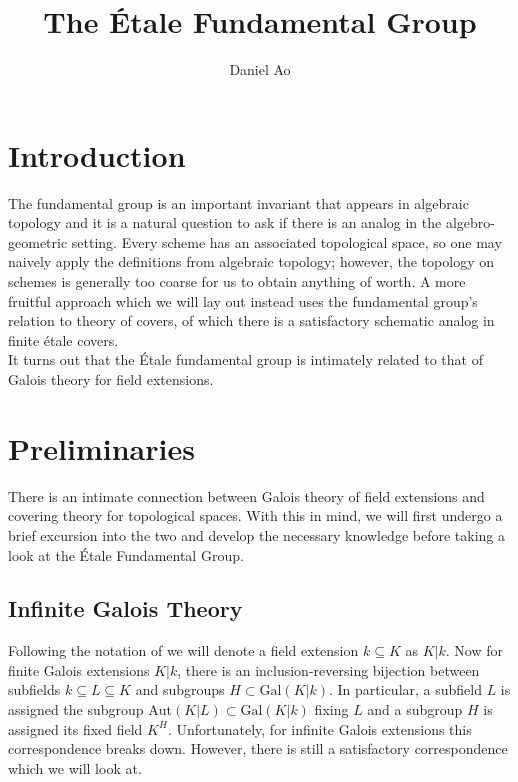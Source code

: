 \documentclass{article}
\theoremstyle{definition}
\theoremstyle{remark}
\begin{document}
\title{The \'Etale Fundamental Group}
\author{Daniel Ao}

\maketitle

\tableofcontents

\section{Introduction}

The fundamental group is an important invariant that appears in algebraic topology and it is a natural question to ask if there is an analog in the algebro-geometric setting.
Every scheme has an associated topological space, so one may naively apply the definitions from algebraic topology; however, the topology on schemes is generally too coarse for us to obtain anything of worth.
A more fruitful approach which we will lay out instead uses the fundamental group's relation to theory of covers, of which there is a satisfactory schematic analog in finite \'etale covers.\\

It turns out that the \'Etale fundamental group is intimately related to that of Galois theory for field extensions.

\section{Preliminaries}

There is an intimate connection between Galois theory of field extensions and covering theory for topological spaces.
With this in mind, we will first undergo a brief excursion into the two and develop the necessary knowledge before taking a look at the \'Etale Fundamental Group.

\subsection{Infinite Galois Theory}

Following the notation of \cite{Szamuely} we will denote a field extension $k \subseteq K$ as $K|k$. 
Now for finite Galois extensions $K|k$, there is an inclusion-reversing bijection between subfields $k \subseteq L \subseteq K$ and subgroups $H \subset \text{Gal}(K|k)$.
In particular, a subfield $L$ is assigned the subgroup $\text{Aut}(K|L) \subset \text{Gal}(K|k)$ fixing $L$ and a subgroup $H$ is assigned its fixed field $K^H$.
Unfortunately, for infinite Galois extensions this correspondence breaks down.
However, there is still a satisfactory correspondence which we will look at.\\
\end{document}
